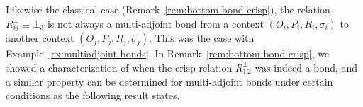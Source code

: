 \documentclass[runningheads,a4paper]{llncs}
\begin{document}
Likewise the classical case (Remark~\ref{rem:bottom-bond-crisp}), the relation $R_{ij}^\bot \equiv \bot_3$ is not always  a multi-adjoint bond from a context $(O_i, P_i, R_i, \sigma_i)$ to another context $(O_j, P_j, R_j, \sigma_j)$. This was the case with Example~\ref{ex:multiadjoint-bonds}. In Remark~\ref{rem:bottom-bond-crisp}, we showed a characterization of when the crisp relation $R_{1\,2}^\bot$ was indeed a bond, and a similar property can be determined for multi-adjoint bonds under certain conditions as the following result states. 

\end{document}
